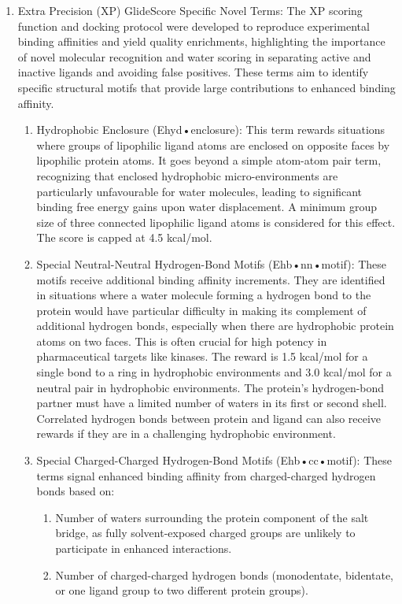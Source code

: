 \documentclass[11pt]{article}
\begin{document}
\begin{enumerate}
\begin{enumerate}
    \end{enumerate}
    \item  Extra Precision (XP) GlideScore Specific Novel Terms: The XP scoring function and docking protocol were developed to reproduce experimental binding affinities and yield quality enrichments, highlighting the importance of novel molecular recognition and water scoring in separating active and inactive ligands and avoiding false positives. These terms aim to identify specific structural motifs that provide large contributions to enhanced binding affinity.
     \begin{enumerate}
    \item Hydrophobic Enclosure (Ehyd•enclosure): This term rewards situations where groups of lipophilic ligand atoms are enclosed on opposite faces by lipophilic protein atoms. It goes beyond a simple atom-atom pair term, recognizing that enclosed hydrophobic micro-environments are particularly unfavourable for water molecules, leading to significant binding free energy gains upon water displacement. A minimum group size of three connected lipophilic ligand atoms is considered for this effect. The score is capped at 4.5 kcal/mol.
    \item Special Neutral-Neutral Hydrogen-Bond Motifs (Ehb•nn•motif): These motifs receive additional binding affinity increments. They are identified in situations where a water molecule forming a hydrogen bond to the protein would have particular difficulty in making its complement of additional hydrogen bonds, especially when there are hydrophobic protein atoms on two faces. This is often crucial for high potency in pharmaceutical targets like kinases. The reward is 1.5 kcal/mol for a single bond to a ring in hydrophobic environments and 3.0 kcal/mol for a neutral pair in hydrophobic environments. The protein's hydrogen-bond partner must have a limited number of waters in its first or second shell. Correlated hydrogen bonds between protein and ligand can also receive rewards if they are in a challenging hydrophobic environment.
    \item Special Charged-Charged Hydrogen-Bond Motifs (Ehb•cc•motif): These terms signal enhanced binding affinity from charged-charged hydrogen bonds based on:
           \begin{enumerate}
        \item Number of waters surrounding the protein component of the salt bridge, as fully solvent-exposed charged groups are unlikely to participate in enhanced interactions.
        \item Number of charged-charged hydrogen bonds (monodentate, bidentate, or one ligand group to two different protein groups).

\end{enumerate}
\end{enumerate}
\end{enumerate}
\end{document}
